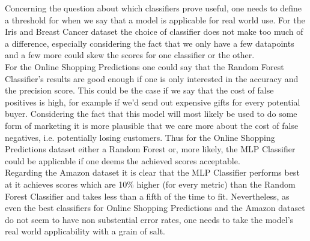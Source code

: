 \documentclass{article}
\begin{document}
Concerning the question about which classifiers prove useful, one needs to define a threshold for when we say that a model is applicable for real world use. For the Iris and Breast Cancer dataset the choice of classifier does not make too much of a difference, especially considering the fact that we only have a few datapoints and a few more could skew the scores for one classifier or the other. \\
For the Online Shopping Predictions one could say that the Random Forest Classifier's results are good enough if one is only interested in the accuracy and the precision score. This could be the case if we say that the cost of false positives is high, for example if we'd send out expensive gifts for every potential buyer. Considering the fact that this model will most likely be used to do some form of marketing it is more plausible that we care more about the cost of false negatives, i.e. potentially losing customers. Thus for the Online Shopping Predictions dataset either a Random Forest or, more likely, the MLP Classifier could be applicable if one deems the achieved scores acceptable. \\
Regarding the Amazon dataset it is clear that the MLP Classifier performs best at it achieves scores which are 10\% higher (for every metric) than the Random Forest Classifier and takes less than a fifth of the time to fit. Nevertheless, as even the best classifiers for Online Shopping Predictions and the Amazon dataset do not seem to have non substential error rates, one needs to take the model's real world applicability with a grain of salt. \\
\newline
\end{document}
